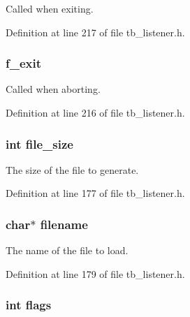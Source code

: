 Called when exiting. 



Definition at line 217 of file tb\-\_\-listener.\-h.

\hypertarget{structtb__listener__t_a90a87c6e5bc8d9e690190da6d0aa926e}{
\subsubsection[{f\-\_\-exit}]{ f\-\_\-exit}}\label{structtb__listener__t_a90a87c6e5bc8d9e690190da6d0aa926e}


Called when aborting. 



Definition at line 216 of file tb\-\_\-listener.\-h.

\hypertarget{structtb__listener__t_a8bc95708c758a6400d8692f2d0fcbaeb}{
\subsubsection[{file\-\_\-size}]{\setlength{\rightskip}{0pt plus 5cm}int file\-\_\-size}}\label{structtb__listener__t_a8bc95708c758a6400d8692f2d0fcbaeb}


The size of the file to generate. 



Definition at line 177 of file tb\-\_\-listener.\-h.

\hypertarget{structtb__listener__t_aeac90097f29f7529968697163cea5c18}{
\subsubsection[{filename}]{\setlength{\rightskip}{0pt plus 5cm}char$\ast$ filename}}\label{structtb__listener__t_aeac90097f29f7529968697163cea5c18}


The name of the file to load. 



Definition at line 179 of file tb\-\_\-listener.\-h.

\hypertarget{structtb__listener__t_ac8bf36fe0577cba66bccda3a6f7e80a4}{
\subsubsection[{flags}]{\setlength{\rightskip}{0pt plus 5cm}int flags}}\label{structtb__listener__t_ac8bf36fe0577cba66bccda3a6f7e80a4}


